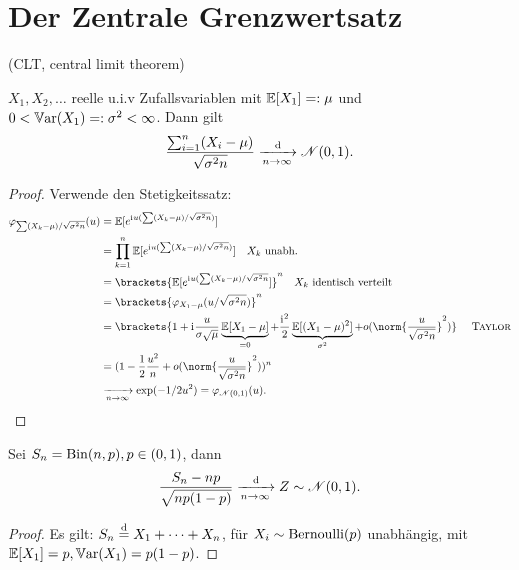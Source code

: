 \section{Der Zentrale Grenzwertsatz}
(CLT, central limit theorem)\\
\begin{proposition}
	$X_1, X_2, \dots$ reelle u.i.v Zufallsvariablen mit $\mathbb{E}[X_1] =: \mu$ und $0 <\mathbb{V}\text{ar}(X_1) =: \sigma^2 < \infty$. Dann gilt
	\begin{align*}
		\frac{\sum_{i=1}^n (X_i -\mu)}{\sqrt{\sigma^2 n}} \xrightarrow[n \to \infty]{\,\mathrm{d}} \mathscr N(0,1).
	\end{align*}
\end{proposition}
\begin{proof}
	Verwende den Stetigkeitssatz:
	\begin{align*}
		\varphi_{\sum (X_k - \mu)/\sqrt{\sigma^2 n}} (u) &= \E[e^{\ii u (\sum (X_k - \mu )/\sqrt{\sigma^2n})}]\\
		&= \prod_{k=1}^n \E[e^{\ii u (\sum (X_k - \mu )/\sqrt{\sigma^2n})}] \quad X_k \text{ unabh.}\\
		&= \brackets{\E[e^{\ii u (\sum (X_k - \mu )/\sqrt{\sigma^2n}}]}^n\quad X_k \text{ identisch verteilt}\\
		&= \brackets{\varphi_{X_1 - \mu} (u / \sqrt{\sigma^2 n})}^n\\
		&= \brackets{1 + \ii \frac{u}{\sigma\sqrt{\mu}} \underbrace{\E[X_1 -\mu]}_{=0} + \frac{\ii^2}{2} \underbrace{\E[(X_1 - \mu)^2]}_{\sigma^2} + o(\norm{\frac{u}{\sqrt{\sigma^2 n}}}^2)} \quad \text{ \person{Taylor}}\\
		&= (1- \frac{1}{2} \frac{u^2}{n} + o(\norm{\frac{u}{\sqrt{\sigma^2 n}}}^2))^n\\
		&\xrightarrow[n \to \infty]{} \exp(-1/2 u^2) = \varphi_{\normal(0,1)}(u).
	\end{align*}
\end{proof}
\begin{conclusion}
	Sei $S_n= \operatorname{Bin}(n,p), p \in (0,1)$, dann
	\begin{align*}
		\frac{S_n - np}{\sqrt{np(1-p)}} \xrightarrow[n \to \infty]{\,\mathrm{d}} Z \sim \mathscr N(0,1).
	\end{align*}
\end{conclusion}
\begin{proof}
	Es gilt: $S_n \overset{\text{d}}{=} X_1 + \dots + X_n$, für $X_i \sim \operatorname{Bernoulli}(p)$ unabhängig, mit $\mathbb{E}[X_1] = p, \mathbb{V}\text{ar}(X_1) = p(1-p)$.
\end{proof}
